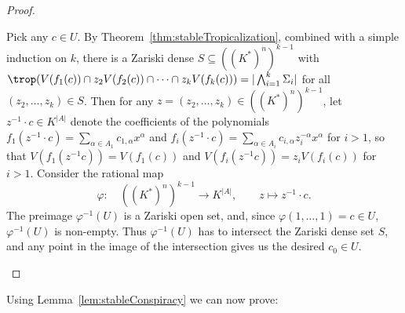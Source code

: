 \begin{proof}
\begin{description}[leftmargin=0 pt]
  Pick any $c\in U$. By Theorem~\ref{thm:stableTropicalization}, combined with a simple induction on $k$, there is a Zariski dense $S\subseteq ((K^\ast)^n)^{k-1}$ with $\trop(V(f_1(c))\cap z_2V(f_2(c))\cap\cdots\cap z_kV(f_k(c)))=|\bigwedge_{i=1}^k\Sigma_i|$ for all ${(z_2,\dots,z_k)\in S}$. Then for any $z=(z_2,\dots,z_k)\in ((K^\ast)^n)^{k-1}$, let $z^{-1}\cdot c\in K^{|A|}$ denote the coefficients of the polynomials $f_1(z^{-1}\cdot c)=\sum_{\alpha\in A_1}c_{1,\alpha} x^\alpha$ and $f_i(z^{-1}\cdot c)=\sum_{\alpha\in A_i}c_{i,\alpha} z_i^{-\alpha}x^\alpha$ for $i>1$, so that $V(f_1(z^{-1}c))=V(f_1(c))$ and $V(f_i(z^{-1}c))=z_i V(f_i(c))$ for $i>1$. Consider the rational map
  \[ \varphi\colon\quad ((K^\ast)^n)^{k-1}\rightarrow K^{|A|}, \qquad z\mapsto z^{-1}\cdot c. \]
  The preimage $\varphi^{-1}(U)$ is a Zariski open set, and, since $\varphi(1,\dots,1)=c\in U$, $\varphi^{-1}(U)$ is non-empty. Thus $\varphi^{-1}(U)$ has to intersect the Zariski dense set $S$, and any point in the image of the intersection gives us the desired $c_0\in U$. \qedhere
  \end{description}
\end{proof}

Using Lemma~\ref{lem:stableConspiracy} we can now prove:

